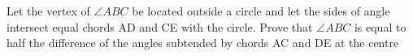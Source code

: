 Let the vertex of $\angle{ABC}$ be located outside a circle and let the sides of angle intersect equal chords AD and CE with the circle.
\newline
Prove that $\angle{ABC}$ is equal to half the difference of the angles subtended by chords AC and DE at the centre
